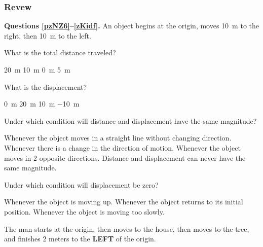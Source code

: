 \documentclass[]{exam}
\newcounter{reviewcounter}
\begin{document}
\clearpage

\subsubsection*{Revew \thereviewcounter}

\begin{questions}

\begin{EnvUplevel}
    \textbf{Questions \ref{pzNZ6}--\ref{zKidf}.} An object begins at the origin, moves \SI{10}{m} to the right, then \SI{10}{m} to the left.
\end{EnvUplevel}


\question \label{pzNZ6}
What is the total distance traveled?
\begin{randomizechoices}
    \correctchoice \SI{20}{m}
    \choice \SI{10}{m}
    \choice \SI{0}{m}
    \choice \SI{5}{m}
\end{randomizechoices}

\question \label{zKidf}
What is the displacement?
\begin{randomizechoices}
    \correctchoice \SI{0}{m}
    \choice \SI{20}{m}
    \choice \SI{10}{m}
    \choice \SI{-10}{m}
\end{randomizechoices}


\question
Under which condition will distance and displacement have the same magnitude?

\begin{randomizechoices}[keeplast]
    \correctchoice Whenever the object moves in a straight line without changing direction.
    \choice Whenever there is a change in the direction of motion.
    \choice Whenever the object moves in 2 opposite directions.
    \choice Distance and displacement can never have the same magnitude.
\end{randomizechoices}

\question
Under which condition will displacement be zero?

\begin{randomizechoices}
    \choice Whenever the object is moving up.
    \correctchoice Whenever the object returns to its initial position.
    \choice Whenever the object is moving too slowly.
\end{randomizechoices}

\question
The man starts at the origin, then moves to the house, then moves to the tree, and finishes 2 meters to the \textbf{LEFT} of the origin. 


\end{questions}
\end{document}
